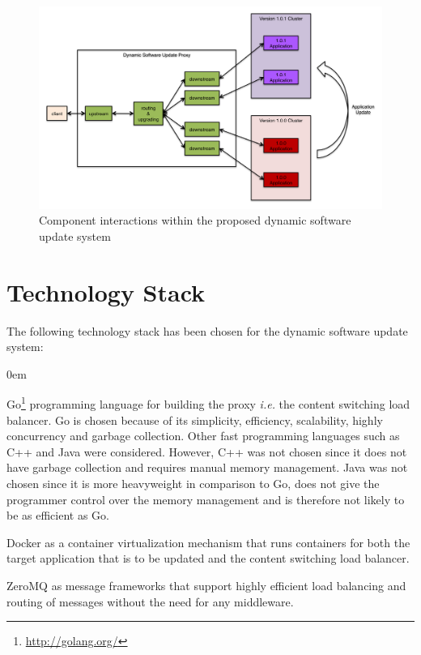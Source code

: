 \documentclass[a4paper,11pt,twoside]{report}
\begin{document}
\begin{figure}[!ht]
  \centering
     \includegraphics[scale=0.31]{proposed_solution}
  \caption{Component interactions within the proposed  dynamic software update system}
  \label{proposed_solution}
\end{figure}


\section{Technology Stack} 
The following technology stack has been chosen for the dynamic software update system:

\begin{list}{-}{}
  \itemsep0em
  \item Go\footnote{\url{http://golang.org/}} programming language for building the proxy \textit{i.e.} the content switching load balancer. Go is chosen because of its simplicity, efficiency, scalability, highly concurrency and garbage collection. Other fast programming languages such as C++ and Java were considered. However, C++ was not chosen since it does not have garbage collection and requires manual memory management. Java was not chosen since it is more heavyweight in comparison to Go, does not give the programmer control over the memory management and is therefore not likely to be as efficient as Go.
    
  \item Docker as a container virtualization mechanism that runs containers for both the target application that is to be updated and the content switching load balancer.
  
  \item ZeroMQ as message frameworks that support highly efficient load balancing and routing of messages without the need for any middleware.

    \end{list}
\clearpage
\end{document}
